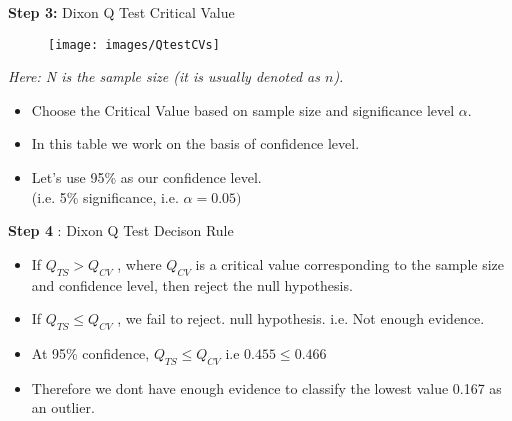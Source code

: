 \documentclass[a4paper,12pt]{article}
\begin{document}
	

	




\textbf{Step 3:} Dixon Q Test Critical Value\\ \smallskip

\begin{figure}[h!]
	\centering
	\texttt{[image: images/QtestCVs]}
\end{figure}

\textit{Here: N is the sample size (\textit{it is usually denoted as $n$}).}




\begin{itemize}
	\item Choose the Critical Value based on sample size and significance level $\alpha$. \smallskip
	\item In this table we work on the basis of confidence level. \smallskip \item Let's use 95\% as our confidence level. \\ (i.e. 5\% significance, i.e. $\alpha=0.05)$ 
	
\end{itemize}


\textbf{Step 4} : Dixon Q Test Decison Rule
\begin{itemize}
	\item 	If $Q_{TS} > Q_{CV}$ , where $Q_{CV}$ is a critical value corresponding to the sample size and confidence level, then reject the null hypothesis. 
	\item  If $Q_{TS} \leq Q_{CV}$ , we fail to reject. null hypothesis. i.e. Not enough evidence. \smallskip
	\item At 95\% confidence, $Q_{TS} \leq Q_{CV}$ i.e $ 0.455 \leq 0.466$ 
	\item Therefore we dont have enough evidence to classify the lowest value 0.167 as an outlier. 
	
\end{itemize}	
\end{document}
